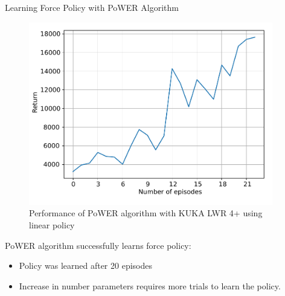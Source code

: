 \documentclass[aspectratio=169]{beamer}
\begin{document}
\begin{frame}
	Learning Force Policy with PoWER Algorithm
	
	\begin{minipage}[t]{0.51\textwidth}
		\begin{figure}
			\includegraphics[width=0.95\textwidth]{images/exp/cut/power_return2n}
			\caption{\scriptsize Performance of PoWER algorithm with KUKA LWR 4+ using linear policy}
		\end{figure}
	\end{minipage}
	\hfill
	\begin{minipage}[t]{0.47\textwidth}
		
		\vspace{0.5cm}
		PoWER algorithm successfully learns force policy:
		\begin{itemize}
			\scriptsize 
			\item Policy was learned after 20 episodes
			\item Increase in number parameters requires more trials to learn the policy.
		\end{itemize}
	\end{minipage}
\end{frame}
\end{document}
